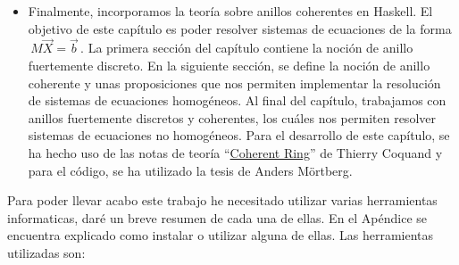 \begin{itemize}
\item Finalmente, incorporamos la teoría sobre anillos coherentes en Haskell. El objetivo de este capítulo es poder resolver sistemas de ecuaciones de la forma $\,M\vec{X}=\vec{b}\,$. La primera sección del capítulo contiene la noción de anillo fuertemente discreto. En la siguiente sección, se define la noción de anillo coherente y unas proposiciones que nos permiten implementar la resolución de sistemas de ecuaciones homogéneos. Al final del capítulo, trabajamos con anillos fuertemente discretos y coherentes, los cuáles nos permiten resolver sistemas de ecuaciones no homogéneos. Para el desarrollo de este capítulo, se ha hecho uso de las notas de teoría ``\href{http://www.cse.chalmers.se/~coquand/FISCHBACHAU/t2.pdf}{Coherent Ring}'' de Thierry Coquand y para el código, se ha utilizado la tesis de Anders Mörtberg.

\end{itemize}

Para poder llevar acabo este trabajo he necesitado utilizar varias herramientas informaticas, daré un breve resumen de cada una de ellas. En el Apéndice se encuentra explicado como instalar o utilizar alguna de ellas. Las herramientas utilizadas son:\\

